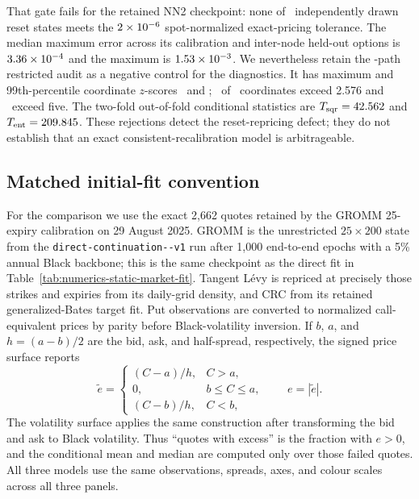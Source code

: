 That gate fails for the retained NN2 checkpoint: none of
\CrcResetGateSamples\ independently drawn reset states meets the
$2\times10^{-6}$ spot-normalized exact-pricing tolerance.  The median
maximum error across its calibration and inter-node held-out options is
$3.36\times10^{-4}$ and the maximum is $1.53\times10^{-3}$.
We nevertheless retain the \CrcQPathCount-path restricted audit as a negative
control for the diagnostics.  It has maximum and 99th-percentile coordinate
$z$-scores \CrcQMaximumAbsZ\ and \CrcQPercentileNineNineAbsZ; \CrcQAboveTwoFiveSevenSix\ of
\CrcQCoordinates\ coordinates exceed 2.576 and \CrcQAboveFive\ exceed five.
The two-fold out-of-fold conditional statistics are
$T_{\mathrm{sqr}}=42.562$ and $T_{\mathrm{ent}}=209.845$.
These rejections detect the reset-repricing defect; they do not establish that
an exact consistent-recalibration model is arbitrageable.

\subsection{Matched initial-fit convention}

For the comparison we use the exact 2,662 quotes retained by the GROMM
25-expiry calibration on 29 August 2025.  GROMM is the unrestricted
$25\times200$ state from the
\texttt{direct-continuation--v1} run after
1,000 end-to-end epochs with a 5\% annual Black backbone; this is the same
checkpoint as the direct fit in Table~\ref{tab:numerics-static-market-fit}.
Tangent L\'evy is repriced at precisely those strikes and expiries from its
daily-grid density, and CRC from its retained generalized-Bates target fit.
Put observations are converted to normalized
call-equivalent prices by parity before Black-volatility inversion.  If $b$,
$a$, and $h=(a-b)/2$ are the bid, ask, and half-spread, respectively, the
signed price surface reports
\[
  \widetilde e=
  \begin{cases}
    (C-a)/h,&C>a,\\
    0,&b\leq C\leq a,\\
    (C-b)/h,&C<b,
  \end{cases}
  \qquad e=|\widetilde e|.
\]
The volatility surface applies the same construction after transforming the
bid and ask to Black volatility.  Thus ``quotes with excess'' is the fraction
with $e>0$, and the conditional mean and median are computed only over those
failed quotes.  All three models use the same observations, spreads, axes, and
colour scales across all three panels.
